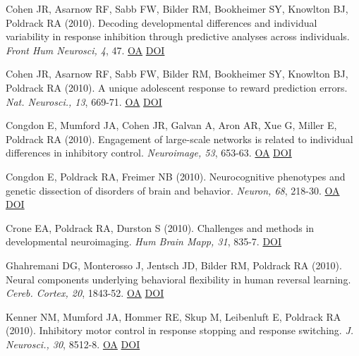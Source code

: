 Cohen JR, Asarnow RF, Sabb FW, Bilder RM, Bookheimer SY, Knowlton BJ, Poldrack RA (2010). Decoding developmental differences and individual variability in response inhibition through predictive analyses across individuals. \textit{Front Hum Neurosci, 4}, 47. \href{https://www.ncbi.nlm.nih.gov/pmc/articles/PMC2906202}{OA} \href{http://dx.doi.org/10.3389/fnhum.2010.00047}{DOI} \vspace{2mm}

Cohen JR, Asarnow RF, Sabb FW, Bilder RM, Bookheimer SY, Knowlton BJ, Poldrack RA (2010). A unique adolescent response to reward prediction errors. \textit{Nat. Neurosci., 13}, 669-71. \href{https://www.ncbi.nlm.nih.gov/pmc/articles/PMC2876211}{OA} \href{http://dx.doi.org/10.1038/nn.2558}{DOI} \vspace{2mm}

Congdon E, Mumford JA, Cohen JR, Galvan A, Aron AR, Xue G, Miller E, Poldrack RA (2010). Engagement of large-scale networks is related to individual differences in inhibitory control. \textit{Neuroimage, 53}, 653-63. \href{https://www.ncbi.nlm.nih.gov/pmc/articles/PMC2930099}{OA} \href{http://dx.doi.org/10.1016/j.neuroimage.2010.06.062}{DOI} \vspace{2mm}

Congdon E, Poldrack RA, Freimer NB (2010). Neurocognitive phenotypes and genetic dissection of disorders of brain and behavior. \textit{Neuron, 68}, 218-30. \href{https://www.ncbi.nlm.nih.gov/pmc/articles/PMC4123421}{OA} \href{http://dx.doi.org/10.1016/j.neuron.2010.10.007}{DOI} \vspace{2mm}

Crone EA, Poldrack RA, Durston S (2010). Challenges and methods in developmental neuroimaging. \textit{Hum Brain Mapp, 31}, 835-7. \href{http://dx.doi.org/10.1002/hbm.21053}{DOI} \vspace{2mm}

Ghahremani DG, Monterosso J, Jentsch JD, Bilder RM, Poldrack RA (2010). Neural components underlying behavioral flexibility in human reversal learning. \textit{Cereb. Cortex, 20}, 1843-52. \href{https://www.ncbi.nlm.nih.gov/pmc/articles/PMC2901019}{OA} \href{http://dx.doi.org/10.1093/cercor/bhp247}{DOI} \vspace{2mm}

Kenner NM, Mumford JA, Hommer RE, Skup M, Leibenluft E, Poldrack RA (2010). Inhibitory motor control in response stopping and response switching. \textit{J. Neurosci., 30}, 8512-8. \href{https://www.ncbi.nlm.nih.gov/pmc/articles/PMC2905623}{OA} \href{http://dx.doi.org/10.1523/jneurosci.1096-10.2010}{DOI} \vspace{2mm}

